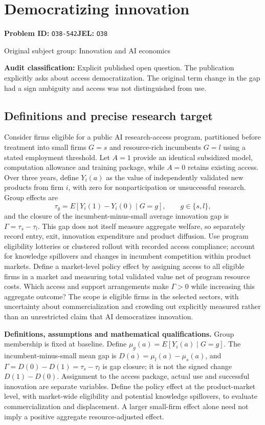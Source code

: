 \documentclass[11pt,a4paper]{article}
\begin{document}
\section*{Democratizing innovation}
\textbf{Problem ID:} \texttt{O38-542}\quad \textbf{JEL:} \texttt{O38}\par
\label{problem:OP-0412}
{\sffamily\small\color{muted}Original subject group: Innovation and AI economics\par}
\label{definitions:problem:30007694}
\textbf{Audit classification:} Explicit published open question. The publication explicitly asks about access democratization. The original term change in the gap had a sign ambiguity and access was not distinguished from use.
\subsection*{Definitions and precise research target}
Consider firms eligible for a public AI research-access program, partitioned before treatment into small firms \(G=s\) and resource-rich incumbents \(G=l\) using a stated employment threshold. Let \(A=1\) provide an identical subsidized model, computation allowance and training package, while \(A=0\) retains existing access. Over three years, define \(Y_i(a)\) as the value of independently validated new products from firm \(i\), with zero for nonparticipation or unsuccessful research. Group effects are
\[
\tau_g=E[Y_i(1)-Y_i(0)\mid G=g],\qquad g\in\{s,l\},
\]
and the closure of the incumbent-minus-small average innovation gap is \(\Gamma=\tau_s-\tau_l\). This gap does not itself measure aggregate welfare, so separately record entry, exit, innovation expenditure and product diffusion. Use program eligibility lotteries or clustered rollout with recorded access compliance; account for knowledge spillovers and changes in incumbent competition within product markets. Define a market-level policy effect by assigning access to all eligible firms in a market and measuring total validated value net of program resource costs. Which access and support arrangements make \(\Gamma>0\) while increasing this aggregate outcome? The scope is eligible firms in the selected sectors, with uncertainty about commercialization and crowding out explicitly measured rather than an unrestricted claim that AI democratizes innovation.

\textbf{Definitions, assumptions and mathematical qualifications.} Group membership is fixed at baseline. Define \(\mu_g(a)=E[Y_i(a)\mid G=g]\). The incumbent-minus-small mean gap is \(D(a)=\mu_l(a)-\mu_s(a)\), and \(\Gamma=D(0)-D(1)=\tau_s-\tau_l\) is gap closure; it is not the signed change \(D(1)-D(0)\). Assignment to the access package, actual use and successful innovation are separate variables. Define the policy effect at the product-market level, with market-wide eligibility and potential knowledge spillovers, to evaluate commercialization and displacement. A larger small-firm effect alone need not imply a positive aggregate resource-adjusted effect.
\end{document}
